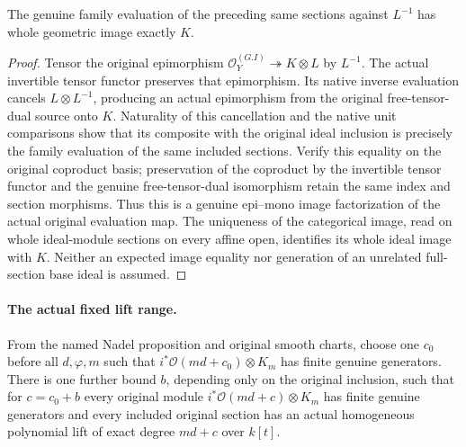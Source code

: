 \begin{lemma}
\label{lem:c0n-cone-generators-whole-image}
\leanok
The genuine family evaluation of the preceding same sections against
$L^{-1}$ has whole geometric image exactly $K$.
\end{lemma}
\begin{proof}
Tensor the original epimorphism
$\mathcal O_Y^{(G.I)}\twoheadrightarrow K\otimes L$ by $L^{-1}$.
The actual invertible tensor functor preserves that epimorphism.  Its
native inverse evaluation cancels $L\otimes L^{-1}$, producing an actual
epimorphism from the original free-tensor-dual source onto $K$.
Naturality of this cancellation and the native unit comparisons show
that its composite with the original ideal inclusion is precisely the
family evaluation of the same included sections.  Verify this equality
on the original coproduct basis; preservation of the coproduct by the
invertible tensor functor and the genuine free-tensor-dual isomorphism
retain the same index and section morphisms.  Thus this is a genuine
epi--mono image factorization of the actual original evaluation map.
The uniqueness of the categorical image, read on whole ideal-module
sections on every affine open, identifies its whole ideal image with
$K$.  Neither an expected image equality nor generation of an unrelated
full-section base ideal is assumed.
\end{proof}

\paragraph{The actual fixed lift range.}
From the named Nadel proposition and original smooth charts, choose one
$c_0$ before all $d,\varphi,m$ such that
$i^*\mathcal O(md+c_0)\otimes K_m$ has finite genuine generators.
There is one further bound $b$, depending only on the original inclusion,
such that for $c=c_0+b$ every original module
$i^*\mathcal O(md+c)\otimes K_m$ has finite genuine generators and every
included original section has an actual homogeneous polynomial lift of
exact degree $md+c$ over $k[t]$.

